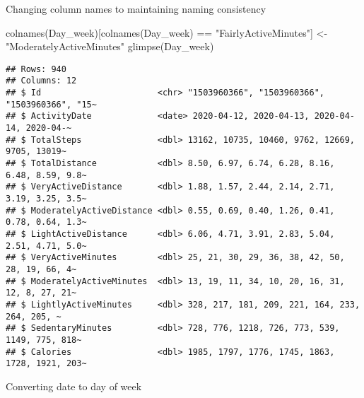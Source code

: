 \documentclass[
]{article}
\newenvironment{Shaded}{\begin{snugshade}}{\end{snugshade}}
\newcommand{\AttributeTok}[1]{\textcolor[rgb]{0.77,0.63,0.00}{#1}}
\newcommand{\FunctionTok}[1]{\textcolor[rgb]{0.00,0.00,0.00}{#1}}
\newcommand{\NormalTok}[1]{#1}
\newcommand{\OtherTok}[1]{\textcolor[rgb]{0.56,0.35,0.01}{#1}}
\newcommand{\SpecialCharTok}[1]{\textcolor[rgb]{0.00,0.00,0.00}{#1}}
\newcommand{\StringTok}[1]{\textcolor[rgb]{0.31,0.60,0.02}{#1}}
\begin{document}
Changing column names to maintaining naming consistency

\begin{Shaded}
\begin{Highlighting}[]
\FunctionTok{colnames}\NormalTok{(Day\_week)[}\FunctionTok{colnames}\NormalTok{(Day\_week) }\SpecialCharTok{==} \StringTok{"FairlyActiveMinutes"}\NormalTok{] }\OtherTok{\textless{}{-}} \StringTok{"ModeratelyActiveMinutes"}
\FunctionTok{glimpse}\NormalTok{(Day\_week)}
\end{Highlighting}
\end{Shaded}

\begin{verbatim}
## Rows: 940
## Columns: 12
## $ Id                       <chr> "1503960366", "1503960366", "1503960366", "15~
## $ ActivityDate             <date> 2020-04-12, 2020-04-13, 2020-04-14, 2020-04-~
## $ TotalSteps               <dbl> 13162, 10735, 10460, 9762, 12669, 9705, 13019~
## $ TotalDistance            <dbl> 8.50, 6.97, 6.74, 6.28, 8.16, 6.48, 8.59, 9.8~
## $ VeryActiveDistance       <dbl> 1.88, 1.57, 2.44, 2.14, 2.71, 3.19, 3.25, 3.5~
## $ ModeratelyActiveDistance <dbl> 0.55, 0.69, 0.40, 1.26, 0.41, 0.78, 0.64, 1.3~
## $ LightActiveDistance      <dbl> 6.06, 4.71, 3.91, 2.83, 5.04, 2.51, 4.71, 5.0~
## $ VeryActiveMinutes        <dbl> 25, 21, 30, 29, 36, 38, 42, 50, 28, 19, 66, 4~
## $ ModeratelyActiveMinutes  <dbl> 13, 19, 11, 34, 10, 20, 16, 31, 12, 8, 27, 21~
## $ LightlyActiveMinutes     <dbl> 328, 217, 181, 209, 221, 164, 233, 264, 205, ~
## $ SedentaryMinutes         <dbl> 728, 776, 1218, 726, 773, 539, 1149, 775, 818~
## $ Calories                 <dbl> 1985, 1797, 1776, 1745, 1863, 1728, 1921, 203~
\end{verbatim}

Converting date to day of week

\begin{Shaded}
\end{Shaded}
\end{document}
